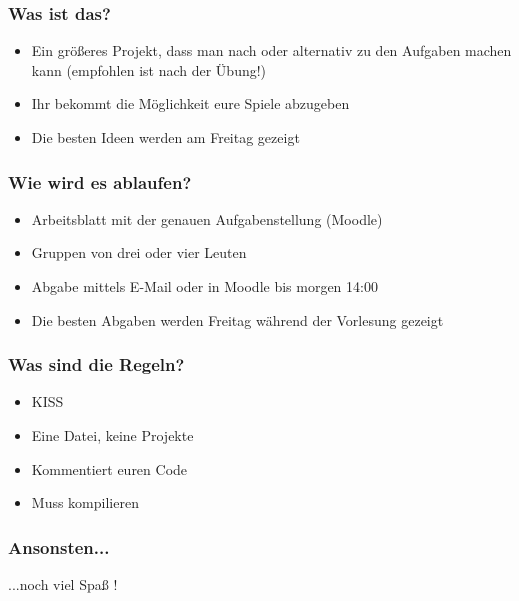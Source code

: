 \begin{frame}
    \frametitle{Was ist das?}
    \begin{itemize}
        \item Ein größeres Projekt, dass man nach oder alternativ zu den Aufgaben machen kann (empfohlen ist nach der Übung!)
        \item Ihr bekommt die Möglichkeit eure Spiele abzugeben
        \item Die besten Ideen werden am Freitag gezeigt
    \end{itemize}
\end{frame}

\begin{frame}
    \frametitle{Wie wird es ablaufen?}
    \begin{itemize}
        \item Arbeitsblatt mit der genauen Aufgabenstellung (Moodle)
        \item Gruppen von drei oder vier Leuten
        \item Abgabe mittels E-Mail oder in Moodle bis morgen 14:00
        \item Die besten Abgaben werden Freitag während der Vorlesung gezeigt
    \end{itemize}
\end{frame}

\begin{frame}
    \frametitle{Was sind die Regeln?}
    \begin{itemize}
        \item KISS
        \item Eine Datei, keine Projekte
        \item Kommentiert euren Code
        \item Muss kompilieren
    \end{itemize}
\end{frame}

\begin{frame}
    \frametitle{Ansonsten...}
    \vspace{15mm}
    \begin{center}
        \huge ...noch viel Spaß !
    \end{center}
\end{frame}

